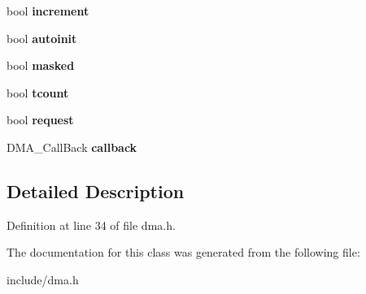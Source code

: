 \begin{DoxyCompactItemize}
\item 
\hypertarget{classDmaChannel_a462fde087b93bc0172eae96bfac4cb78}{bool {\bfseries increment}}\label{classDmaChannel_a462fde087b93bc0172eae96bfac4cb78}

\item 
\hypertarget{classDmaChannel_ad70005267377fb3829595928fc400f9a}{bool {\bfseries autoinit}}\label{classDmaChannel_ad70005267377fb3829595928fc400f9a}

\item 
\hypertarget{classDmaChannel_ad24be4e9ff88231234910ea3ee1eec2d}{bool {\bfseries masked}}\label{classDmaChannel_ad24be4e9ff88231234910ea3ee1eec2d}

\item 
\hypertarget{classDmaChannel_a2e4fad930477a7c01aa3fa99ab621cb9}{bool {\bfseries tcount}}\label{classDmaChannel_a2e4fad930477a7c01aa3fa99ab621cb9}

\item 
\hypertarget{classDmaChannel_a5c77231af669e0e07bbfe6312c19bcd5}{bool {\bfseries request}}\label{classDmaChannel_a5c77231af669e0e07bbfe6312c19bcd5}

\item 
\hypertarget{classDmaChannel_a41e670fcadb263b920f0a4bd86c044b2}{D\-M\-A\-\_\-\-Call\-Back {\bfseries callback}}\label{classDmaChannel_a41e670fcadb263b920f0a4bd86c044b2}

\end{DoxyCompactItemize}


\subsection{Detailed Description}


Definition at line 34 of file dma.\-h.



The documentation for this class was generated from the following file\-:\begin{DoxyCompactItemize}
\item 
include/dma.\-h\end{DoxyCompactItemize}
